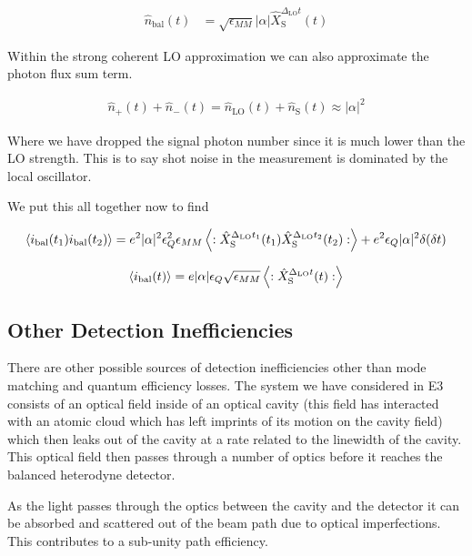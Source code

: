 \documentclass[12pt]{article}
\newcommand{\ep}{\epsilon}
\begin{document}
\begin{align}
\hat{n}_{\text{bal}}(t) &= \sqrt{\ep_{MM}}|\alpha|\hat{X}_{\text{S}}^{\Delta_{\text{LO}}t}(t)
\end{align}

Within the strong coherent LO approximation we can also approximate the photon flux sum term.

\begin{align}
\hat{n}_+(t) + \hat{n}_-(t) = \hat{n}_{\text{LO}}(t) + \hat{n}_{\text{S}}(t) \approx |\alpha|^2
\end{align}

Where we have dropped the signal photon number since it is much lower than the LO strength. This is to say shot noise in the measurement is dominated by the local oscillator.

We put this all together now to find

\begin{align}
\Braket{i_{\text{bal}}(t_1)i_{\text{bal}}(t_2)} = e^2 |\alpha|^2 \ep_Q^2 \ep_{MM} \Braket{:\hat{X}_{\text{S}}^{\Delta_{\text{LO}}t_1}(t_1)\hat{X}_{\text{S}}^{\Delta_{\text{LO}}t_2}(t_2) :} + e^2 \ep_Q |\alpha|^2 \delta(\delta t)
\end{align}

\begin{align}
\Braket{i_{\text{bal}}(t)} = e |\alpha| \ep_Q \sqrt{\ep_{MM}} \Braket{:\hat{X}^{\Delta_{\text{LO}}t}_{\text{S}}(t):}
\end{align}

\subsection{Other Detection Inefficiencies}

There are other possible sources of detection inefficiencies other than mode matching and quantum efficiency losses. The system we have considered in E3 consists of an optical field inside of an optical cavity (this field has interacted with an atomic cloud which has left imprints of its motion on the cavity field) which then leaks out of the cavity at a rate related to the linewidth of the cavity. This optical field then passes through a number of optics before it reaches the balanced heterodyne detector.

As the light passes through the optics between the cavity and the detector it can be absorbed and scattered out of the beam path due to optical imperfections. This contributes to a sub-unity path efficiency.
\end{document}
